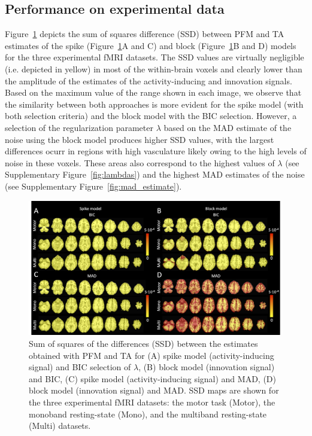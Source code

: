 \subsection{Performance on experimental data}

Figure~\ref{fig:rss} depicts the sum of squares difference (SSD) between PFM and TA estimates of the spike (Figure~\ref{fig:rss}A and C) and block (Figure~\ref{fig:rss}B and D) models for the three experimental fMRI datasets. The SSD values are virtually negligible (i.e. depicted in yellow) in most of the within-brain voxels and clearly lower than the amplitude of the estimates of the activity-inducing and innovation signals. Based on the maximum value of the range shown in each image, we observe that the similarity between both approaches is more evident for the spike model (with both selection criteria) and the block model with the BIC selection. However, a selection of the regularization parameter $\lambda$ based on the MAD estimate of the noise using the block model produces higher SSD values, with the largest differences ocurr in regions with high vasculature likely owing to the high levels of noise in these voxels. These areas also correspond to the highest values of $\lambda$ (see Supplementary Figure~\ref{fig:lambdas}) and the highest MAD estimates of the noise (see Supplementary Figure~\ref{fig:mad_estimate}). 

\begin{figure}[t!]
    \begin{center}
        \includegraphics[width=\textwidth]{figures/comp_figure.png}
    \end{center}
    \caption{Sum of squares of the differences (SSD) between the estimates obtained with PFM and TA for (A) spike model (activity-inducing signal) and BIC selection of $\lambda$, (B) block model (innovation signal) and BIC, (C) spike model (activity-inducing signal) and MAD, (D) block model (innovation signal) and MAD. SSD maps are shown for the three experimental fMRI datasets: the motor task (Motor), the monoband resting-state (Mono), and the multiband resting-state (Multi) datasets.}
\label{fig:rss}
\end{figure}

